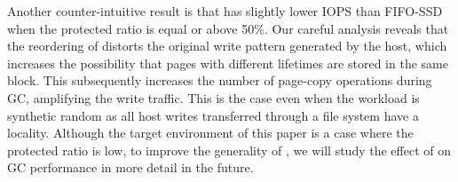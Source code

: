 Another counter-intuitive result is that \ours{} has slightly lower IOPS than
FIFO-SSD when the protected ratio is equal or above 50\%. Our careful analysis
reveals that the reordering of \ours{} distorts the original write pattern
generated by the host, which increases the possibility that pages with
different lifetimes are stored in the same block. This subsequently increases
the number of page-copy operations during GC, amplifying the write traffic. 
This is the case even when the workload is synthetic
random as all host writes transferred through a file system have a locality. 
Although the target environment of this paper is a case where the protected
ratio is low, to improve the generality of \ours{}, we will study
the effect of \ours{} on GC performance in more detail in the future.





%



